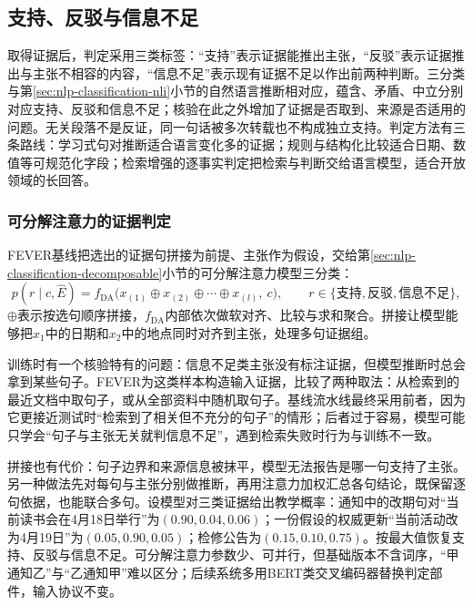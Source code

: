 \subsection{支持、反驳与信息不足}
\label{sec:nlp-dialogue-evidence-relation}

取得证据后，判定采用三类标签：“支持”表示证据能推出主张，“反驳”表示证据推出与主张不相容的内容，“信息不足”表示现有证据不足以作出前两种判断。三分类与第\ref{sec:nlp-classification-nli}小节的自然语言推断相对应，蕴含、矛盾、中立分别对应支持、反驳和信息不足；核验在此之外增加了证据是否取到、来源是否适用的问题。无关段落不是反证，同一句话被多次转载也不构成独立支持。判定方法有三条路线：学习式句对推断适合语言变化多的证据；规则与结构化比较适合日期、数值等可规范化字段；检索增强的逐事实判定把检索与判断交给语言模型，适合开放领域的长回答。

\subsubsection{可分解注意力的证据判定}
\label{sec:nlp-dialogue-decomposable}

FEVER基线把选出的证据句拼接为前提、主张作为假设，交给第\ref{sec:nlp-classification-decomposable}小节的可分解注意力模型三分类：
\begin{equation}
 p(r\mid c,\hat E)=f_{\mathrm{DA}}\bigl(x_{(1)}\oplus x_{(2)}\oplus\cdots\oplus x_{(l)},\ c\bigr),\qquad
 r\in\{\text{支持},\text{反驳},\text{信息不足}\},
 \label{eq:nlp-dialogue-decomposable}
\end{equation}
$\oplus$表示按选句顺序拼接，$f_{\mathrm{DA}}$内部依次做软对齐、比较与求和聚合。拼接让模型能够把$x_1$中的日期和$x_2$中的地点同时对齐到主张，处理多句证据组。

训练时有一个核验特有的问题：信息不足类主张没有标注证据，但模型推断时总会拿到某些句子。FEVER为这类样本构造输入证据，比较了两种取法：从检索到的最近文档中取句子，或从全部资料中随机取句子。基线流水线最终采用前者，因为它更接近测试时“检索到了相关但不充分的句子”的情形；后者过于容易，模型可能只学会“句子与主张无关就判信息不足”，遇到检索失败时行为与训练不一致。

拼接也有代价：句子边界和来源信息被抹平，模型无法报告是哪一句支持了主张。另一种做法先对每句与主张分别做推断，再用注意力加权汇总各句结论，既保留逐句依据，也能联合多句。设模型对三类证据给出教学概率：通知中的改期句对“当前读书会在4月18日举行”为$(0.90,0.04,0.06)$；一份假设的权威更新“当前活动改为4月19日”为$(0.05,0.90,0.05)$；检修公告为$(0.15,0.10,0.75)$。按最大值恢复支持、反驳与信息不足。可分解注意力参数少、可并行，但基础版本不含词序，“甲通知乙”与“乙通知甲”难以区分；后续系统多用BERT类交叉编码器替换判定部件，输入协议不变。

